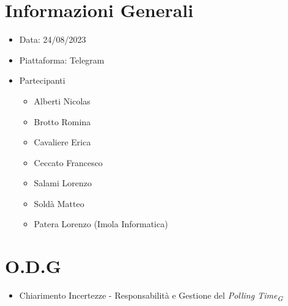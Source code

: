 \documentclass[a4paper, 12pt]{article}
\begin{document}
\makefrontpage
\section*{Informazioni Generali}
\begin{itemize}
    \item Data: 24/08/2023
    \item Piattaforma: Telegram
    \item Partecipanti
    \begin{itemize}
        \item Alberti Nicolas
        \item Brotto Romina
        \item Cavaliere Erica
        \item Ceccato Francesco
        \item Salami Lorenzo
        \item Soldà Matteo
        \item Patera Lorenzo (Imola Informatica)
    \end{itemize}
\end{itemize}
\section*{O.D.G}
\begin{itemize}
    \item Chiarimento Incertezze - Responsabilità e Gestione del \textit{Polling Time\textsubscript{G}}
\end{itemize}
\end{document}
